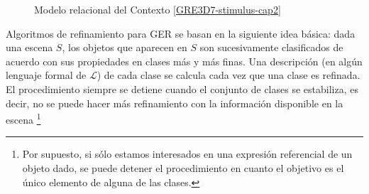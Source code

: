 \begin{figure}[ht]
\begin{center}
\caption{Modelo relacional del Contexto \ref{GRE3D7-stimulus-cap2}}
\label{GRE3D7-stimulus-graph}
\end{center}
\end{figure}

Algoritmos de refinamiento para GER se basan en la siguiente idea b\'asica:
dada una escena $S$, los objetos que aparecen en $S$ son sucesivamente
clasificados de acuerdo con sus propiedades en clases m\'as y m\'as finas. 
Una descripci\'on (en alg\'un lenguaje formal de $\mathcal{L}$) de cada
clase se calcula cada vez que una clase es refinada. El procedimiento siempre
se detiene cuando el conjunto de clases se estabiliza, es decir, no se puede hacer m\'as refinamiento
con la informaci\'on disponible en la escena \footnote{Por supuesto, si s\'olo estamos interesados en una expresi\'on referencial de un objeto dado, se puede detener el procedimiento en cuanto el objetivo es el
   \'unico elemento de alguna de las clases.}

